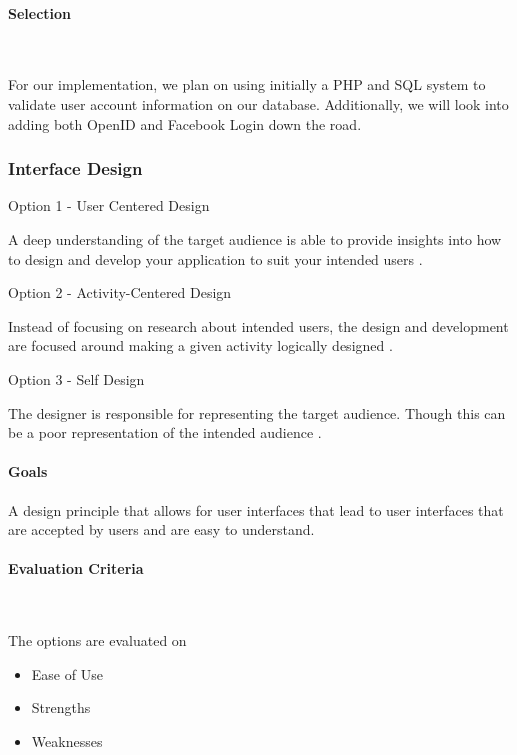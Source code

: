 \documentclass[letterpaper, 10pt, draftclsnofoot, compsoc, onecolumn]{IEEEtran}
\begin{document}
{\medskip
\paragraph{Selection} ~\\
{\noindent For our implementation, we plan on using initially a PHP and SQL system to validate user account information on our database. Additionally, we will look into adding both OpenID and Facebook Login down the road. \par}

\newpage
\subsubsection{Interface Design}
{\noindent Option 1 - User Centered Design \par}
{\noindent A deep understanding of the target audience is able to provide insights into how to design and develop your application to suit your intended users \cite{Usability}. \par}

\medskip
{\noindent Option 2 - Activity-Centered Design  \par}
{\noindent Instead of focusing on research about intended users, the design and development are focused around making a given activity logically designed \cite{AListApart}. \par}

\medskip
{\noindent Option 3 - Self Design \par}
{\noindent The designer is responsible for representing the target audience. Though this can be a poor representation of the intended audience \cite{AListApart}.\par}

\medskip
\paragraph{Goals}
{\noindent A design principle that allows for user interfaces that lead to user interfaces that are accepted by users and are easy to understand.\par}

\medskip
\paragraph{Evaluation Criteria} ~\\
{\noindent The options are evaluated on

\begin{itemize}
\item Ease of Use
\item Strengths
\item Weaknesses


\end{itemize}}}
\end{document}
